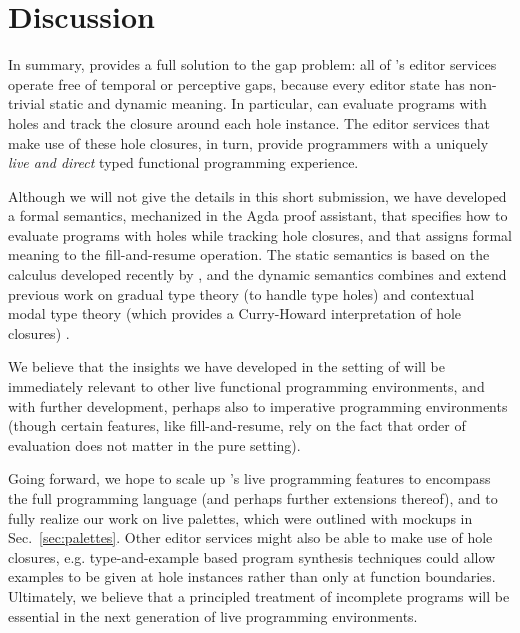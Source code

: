 \section{Discussion}
\label{sec:discussion}
In summary, \Hazel provides a full solution to the gap problem: all of \Hazel's
editor services operate free of temporal or perceptive gaps, because every editor state
has non-trivial static and dynamic meaning. In particular, \Hazel can evaluate programs with holes and track the closure around each hole instance. The editor services that make use of these hole closures, in turn, provide \Hazel programmers with a uniquely 
\emph{live and direct} typed functional programming experience. 

Although we will not give the details in this short submission, we have developed a formal semantics,
mechanized in the Agda proof assistant, that
specifies how to evaluate programs with holes while tracking hole closures, and that assigns formal meaning to the fill-and-resume operation. The static semantics is based on the \Hazelnut calculus developed recently by \citet{popl-paper}, and the dynamic semantics combines and extend previous work on gradual type theory (to handle type holes) \cite{Siek06a,DBLP:conf/snapl/SiekVCB15} and contextual modal type theory (which provides a Curry-Howard interpretation of hole closures) \cite{Nanevski2008}. 

We believe that the insights we have developed in the setting of 
\Hazel will be immediately relevant to other
live functional programming environments, and with further development,
perhaps also to imperative programming environments 
(though certain features, like fill-and-resume, rely on the fact
that order of evaluation does not matter in the pure 
setting). 

Going forward, we hope to scale up \Hazel's live programming features  to encompass the full \Elm programming language (and perhaps further extensions thereof), and to fully realize our work on live palettes, which were outlined with mockups in Sec.~\ref{sec:palettes}. 
Other editor services might also be able to make use of hole closures, e.g. type-and-example based program synthesis techniques \cite{Osera2015} could allow examples to be given at hole instances rather than only at function boundaries. 
Ultimately, we believe that a principled treatment of incomplete
programs will be essential in the next generation of live programming environments.
